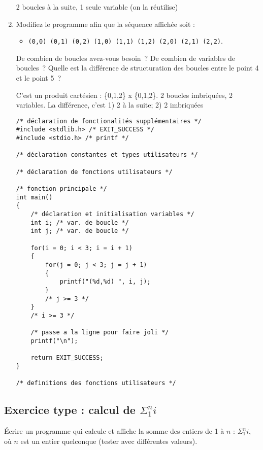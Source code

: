 \begin{enumerate}
  \begin{correction}
    2 boucles à la suite, 1 seule variable (on la réutilise)
  \end{correction}

\item Modifiez le programme afin que la séquence affichée soit :
  \begin{itemize}
  \item \verb|(0,0) (0,1) (0,2) (1,0) (1,1) (1,2) (2,0) (2,1) (2,2)|.
  \end{itemize}
  
  De combien de boucles avez-vous besoin~? De combien de variables de
  boucles~? Quelle est la différence de structuration
  des boucles entre le point 4 et le point 5~?

  \begin{correction}
    C'est un produit cartésien : \{0,1,2\} x \{0,1,2\}. 2 boucles
    imbriquées, 2 variables. La différence, c'est 1) 2 à la suite; 2)
    2 imbriquées 

\begin{verbatim}
/* déclaration de fonctionalités supplémentaires */
#include <stdlib.h> /* EXIT_SUCCESS */
#include <stdio.h> /* printf */

/* déclaration constantes et types utilisateurs */

/* déclaration de fonctions utilisateurs */

/* fonction principale */
int main()
{
    /* déclaration et initialisation variables */
    int i; /* var. de boucle */
    int j; /* var. de boucle */

    for(i = 0; i < 3; i = i + 1)
    {
        for(j = 0; j < 3; j = j + 1)
        {
            printf("(%d,%d) ", i, j);
        }
        /* j >= 3 */
    }
    /* i >= 3 */

    /* passe a la ligne pour faire joli */
    printf("\n");

    return EXIT_SUCCESS;
}

/* definitions des fonctions utilisateurs */
\end{verbatim}
\end{correction}

\end{enumerate}

\subsection{Exercice type : calcul de $\Sigma_1^n i$}

Écrire un programme qui calcule et affiche la somme des entiers de 1 à
$n$ : $\Sigma_1^n i$, où $n$ est un entier quelconque (tester avec
différentes valeurs). 

